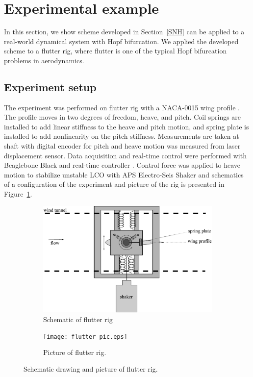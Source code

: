 \documentclass[openacc]{rsproca_new}%
\newcommand{\Sref}[1]{Section~\ref{#1}}
\newcommand{\Fref}[1]{Figure~\ref{#1}}
\begin{document}
\section{Experimental example}
In this section, we show scheme developed in \Sref{SNH} can be applied to a real-world dynamical system with Hopf bifurcation. We applied the developed scheme to a flutter \cite{dimitriadis2017introduction} rig, where flutter is one of the typical Hopf bifurcation problems in aerodynamics.


\subsection{Experiment setup}\label{setup}
The experiment was performed on flutter rig with a NACA-0015 wing profile \cite{jacobs1933characteristics}. The profile moves in two degrees of freedom, heave, and pitch. Coil springs are installed to add linear stiffness to the heave and pitch motion, and spring plate is installed to add nonlinearity on the pitch stiffness. Measurements are taken at shaft with digital encoder for pitch and heave motion was measured from laser displacement sensor. Data acquisition and real-time control were performed with Beaglebone Black and real-time controller \cite{rtc2}. Control force was applied to heave motion to stabilize unstable LCO with APS Electro-Seis Shaker and schematics of a configuration of the experiment and picture of the rig is presented in \Fref{f:rig}.

\begin{figure}
  \centering
  \begin{subfigure}[b]{0.6\linewidth}
    \includegraphics[width=\linewidth]{flutter_rig.eps}
    \caption{Schematic of flutter rig}
  \end{subfigure}
  \begin{subfigure}[b]{0.6\linewidth}
    \texttt{[image: flutter\_pic.eps]}
    \caption{Picture of flutter rig.}
  \end{subfigure}
  \caption{Schematic drawing and picture of flutter rig.}
  \label{f:rig}
\end{figure}
\end{document}
